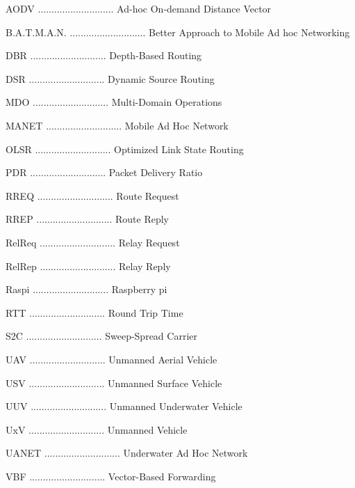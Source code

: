 \documentclass[]{nsm-thesis}
\begin{document}
\listofabbreviations
\newenvironment{abbreviations}{
  \begin{description}
    \setlength{\itemsep}{0.5em} %
}{\end{description}}
\begin{abbreviations}
    \item [AODV] ............................ Ad-hoc On-demand Distance Vector
    \item [B.A.T.M.A.N.] ............................ Better Approach to Mobile Ad hoc Networking 
    \item [DBR] ............................ Depth-Based Routing
    \item [DSR] ............................ Dynamic Source Routing
    \item [MDO] ............................ Multi-Domain Operations
    \item [MANET] ............................ Mobile Ad Hoc Network
    \item [OLSR] ............................ Optimized Link State Routing
    \item [PDR] ............................ Packet Delivery Ratio 
    \item [RREQ] ............................ Route Request 
    \item [RREP] ............................ Route Reply
    \item [RelReq] ............................ Relay Request 
    \item [RelRep] ............................ Relay Reply 
    \item [Raspi] ............................ Raspberry pi
    \item [RTT] ............................ Round Trip Time
    \item [S2C] ............................ Sweep-Spread Carrier
    \item [UAV] ............................ Unmanned Aerial Vehicle
    \item [USV] ............................ Unmanned Surface Vehicle
    \item [UUV] ............................ Unmanned Underwater Vehicle
    \item [UxV] ............................ Unmanned Vehicle
    \item [UANET] ............................ Underwater Ad Hoc Network
    \item [VBF] ............................ Vector-Based Forwarding
    
    
\end{abbreviations}
\clearpage

\listoffigures
\clearpage

\listoftables
\clearpage

\printbibliography
\end{document}
